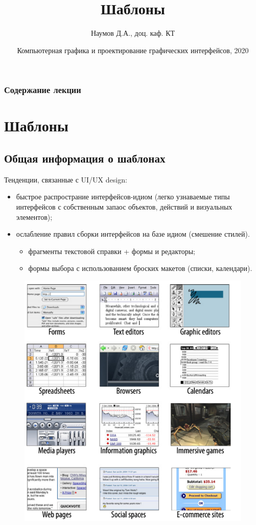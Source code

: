 \documentclass{beamer}
\title[Шаблоны]{Шаблоны}
\author{Наумов Д.А., доц. каф. КТ}
\date[21.10.2020] {Компьютерная графика и проектирование графических интерфейсов, 2020}
\begin{document}
\begin{frame}
  \titlepage
\end{frame}
  
\begin{frame}
  \frametitle{Содержание лекции}
  \tableofcontents  
\end{frame}

\section{Шаблоны}

\subsection{Общая информация о шаблонах}

\begin{frame}[t]
	Тенденции, связанные с UI/UX design:
	\begin{itemize}
		\item быстрое распространие интерфейсов-идиом (легко узнаваемые типы интерфейсов с собственным запаос объектов, действий и визуальных элементов);
		\item ослабление правил сборки интерфейсов на базе идиом (смешение стилей).
		\begin{itemize}
			\item фрагменты текстовой справки + формы и редакторы;
			\item формы выбора с использованием броских макетов (списки, календари).			
		\end{itemize}
	\end{itemize}
	\begin{figure}[h]
		\centering
		\includegraphics[scale=0.5]{images/lec06-pic01.png}
	\end{figure}
\end{frame} 
\end{document}
